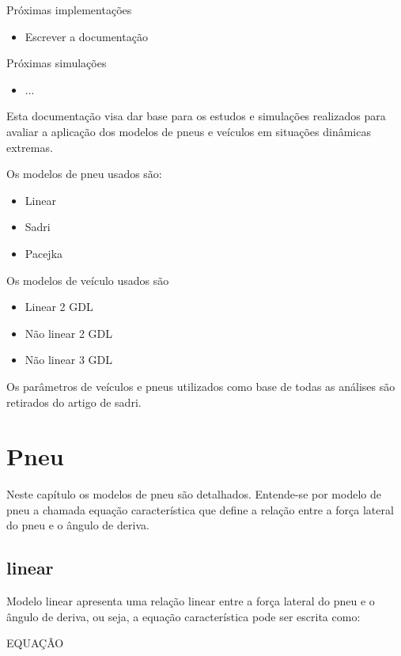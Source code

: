 \documentclass[sublist]{fei}
\begin{document}
Próximas implementações

\begin{itemize}
\item Escrever a documentação
\end{itemize}

Próximas simulações

\begin{itemize}
\item ...
\end{itemize}


Esta documentação visa dar base para os estudos e simulações realizados para avaliar a aplicação dos modelos de pneus e veículos em situações dinâmicas extremas.

Os modelos de pneu usados são:

\begin{itemize}
	\item Linear
	\item Sadri
	\item Pacejka
\end{itemize}

Os modelos de veículo usados são

\begin{itemize}
	\item Linear 2 GDL
	\item Não linear 2 GDL
	\item Não linear 3 GDL
\end{itemize}

Os parâmetros de veículos e pneus utilizados como base de todas as análises são retirados do artigo de sadri.

\chapter{Pneu}

Neste capítulo os modelos de pneu são detalhados. Entende-se por modelo de pneu a chamada equação característica que define a relação entre a força lateral do pneu e o ângulo de deriva.

\section{linear}

Modelo linear apresenta uma relação linear entre a força lateral do pneu e o ângulo de deriva, ou seja, a equação característica pode ser escrita como:

EQUAÇÃO
\end{document}
